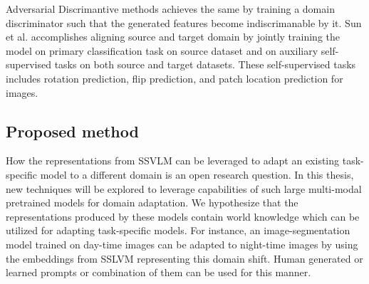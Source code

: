 \documentclass[conference]{IEEEtran}
\begin{document}
Adversarial Discrimantive methods achieves the same by training a domain discriminator such that the generated features become indiscrimanable by it. Sun et al. \cite{sun2019unsupervised} accomplishes aligning source and target domain by jointly training the model on primary classification task on source dataset and on auxiliary self-supervised tasks on both source and target datasets. These self-supervised tasks includes rotation prediction, flip prediction, and patch location prediction for images.

\subsection{Proposed method}
How the representations from SSVLM can be leveraged to adapt an existing task-specific model to a different domain is an open research question. In this thesis, new techniques will be explored to leverage capabilities of such large multi-modal pretrained models for domain adaptation. We hypothesize that the representations produced by these models contain world knowledge which can be utilized for adapting task-specific models. For instance, an image-segmentation model trained on day-time images can be adapted to night-time images by using the embeddings from SSLVM representing this domain shift. Human generated or learned prompts or combination of them can be used for this manner.


\clearpage


\end{document}
